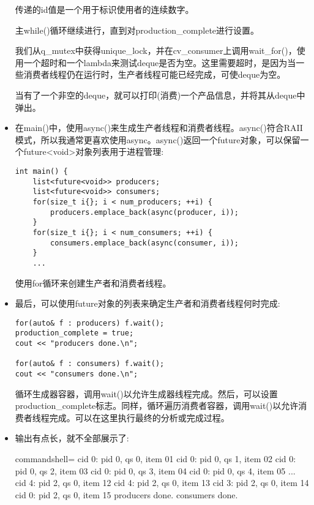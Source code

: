 \begin{itemize}
传递的id值是一个用于标识使用者的连续数字。

主while()循环继续进行，直到对production\_complete进行设置。

我们从q\_mutex中获得unique\_lock，并在cv\_consumer上调用wait\_for()，使用一个超时和一个lambda来测试deque是否为空。这里需要超时，是因为当一些消费者线程仍在运行时，生产者线程可能已经完成，可使deque为空。

当有了一个非空的deque，就可以打印(消费)一个产品信息，并将其从deque中弹出。

\item 
在main()中，使用async()来生成生产者线程和消费者线程。async()符合RAII模式，所以我通常更喜欢使用async。async()返回一个future对象，可以保留一个future<void>对象列表用于进程管理:

\begin{lstlisting}[style=styleCXX]
int main() {
	list<future<void>> producers;
	list<future<void>> consumers;
	for(size_t i{}; i < num_producers; ++i) {
		producers.emplace_back(async(producer, i));
	}
	for(size_t i{}; i < num_consumers; ++i) {
		consumers.emplace_back(async(consumer, i));
	}
	...
\end{lstlisting}

使用for循环来创建生产者和消费者线程。

\item 
最后，可以使用future对象的列表来确定生产者和消费者线程何时完成:

\begin{lstlisting}[style=styleCXX]
for(auto& f : producers) f.wait();
production_complete = true;
cout << "producers done.\n";

for(auto& f : consumers) f.wait();
cout << "consumers done.\n";
\end{lstlisting}

循环生成器容器，调用wait()以允许生成器线程完成。然后，可以设置production\_complete标志。同样，循环遍历消费者容器，调用wait()以允许消费者线程完成。可以在这里执行最终的分析或完成过程。

\item 
输出有点长，就不全部展示了:

\begin{tcblisting}{commandshell={}}
cid 0: pid 0, qs 0, item 01
cid 0: pid 0, qs 1, item 02
cid 0: pid 0, qs 2, item 03
cid 0: pid 0, qs 3, item 04
cid 0: pid 0, qs 4, item 05
...
cid 4: pid 2, qs 0, item 12
cid 4: pid 2, qs 0, item 13
cid 3: pid 2, qs 0, item 14
cid 0: pid 2, qs 0, item 15
producers done.
consumers done.
\end{tcblisting}

\end{itemize}



